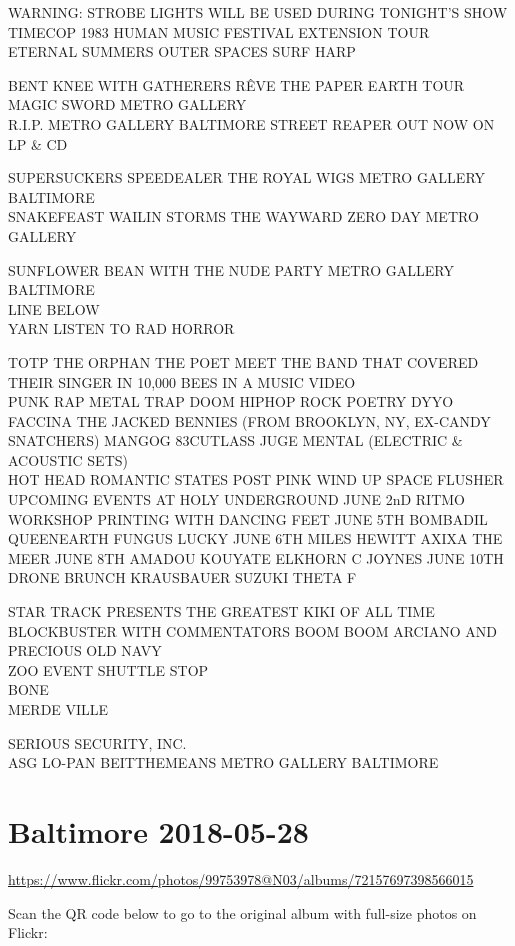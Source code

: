 \documentclass[10pt,letterpaper]{article}
\begin{document}
WARNING: STROBE LIGHTS WILL BE USED DURING TONIGHT'S SHOW\\
TIMECOP 1983 HUMAN MUSIC FESTIVAL EXTENSION TOUR\\
ETERNAL SUMMERS OUTER SPACES SURF HARP

BENT KNEE WITH GATHERERS RÊVE THE PAPER EARTH TOUR\\
MAGIC SWORD METRO GALLERY\\
R.I.P. METRO GALLERY BALTIMORE STREET REAPER OUT NOW ON LP \& CD

SUPERSUCKERS SPEEDEALER THE ROYAL WIGS METRO GALLERY BALTIMORE\\
SNAKEFEAST WAILIN STORMS THE WAYWARD ZERO DAY METRO GALLERY

SUNFLOWER BEAN WITH THE NUDE PARTY METRO GALLERY BALTIMORE\\
LINE BELOW\\
YARN LISTEN TO RAD HORROR

TOTP THE ORPHAN THE POET MEET THE BAND THAT COVERED THEIR SINGER IN 10,000 BEES IN A MUSIC VIDEO\\
PUNK RAP METAL TRAP DOOM HIPHOP ROCK POETRY DYYO FACCINA THE JACKED BENNIES (FROM BROOKLYN, NY, EX{-}CANDY SNATCHERS) MANGOG 83CUTLASS JUGE MENTAL (ELECTRIC \& ACOUSTIC SETS)\\
HOT HEAD ROMANTIC STATES POST PINK WIND UP SPACE FLUSHER\\
UPCOMING EVENTS AT HOLY UNDERGROUND JUNE 2nD RITMO WORKSHOP PRINTING WITH DANCING FEET JUNE 5TH BOMBADIL QUEENEARTH FUNGUS LUCKY JUNE 6TH MILES HEWITT AXIXA THE MEER JUNE 8TH AMADOU KOUYATE ELKHORN C JOYNES JUNE 10TH DRONE BRUNCH KRAUSBAUER SUZUKI THETA F

STAR TRACK PRESENTS THE GREATEST KIKI OF ALL TIME BLOCKBUSTER WITH COMMENTATORS BOOM BOOM ARCIANO AND PRECIOUS OLD NAVY\\
ZOO EVENT SHUTTLE STOP\\
BONE\\
MERDE VILLE

SERIOUS SECURITY, INC.\\
ASG LO{-}PAN BEITTHEMEANS METRO GALLERY BALTIMORE
\pagebreak

\section*{Baltimore 2018-05-28}

\url{https://www.flickr.com/photos/99753978@N03/albums/72157697398566015}

Scan the QR code below to go to the original album with full-size photos on Flickr:
\end{document}
